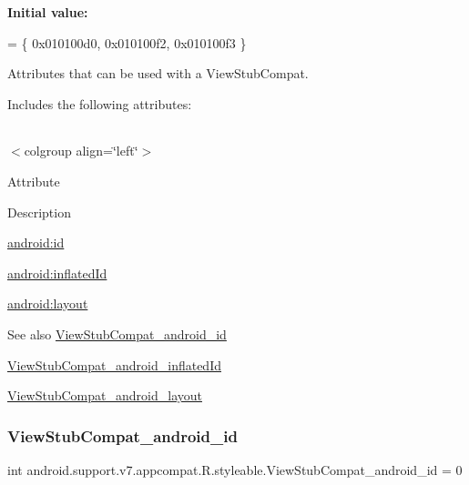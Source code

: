 {\bfseries Initial value\+:}
\begin{DoxyCode}
= \{
            0x010100d0, 0x010100f2, 0x010100f3
        \}
\end{DoxyCode}
Attributes that can be used with a View\+Stub\+Compat. 

Includes the following attributes\+:

\tabulinesep=1mm
\begin{longtabu} spread 0pt [c]{*{0}{|X[-1]}|}
\hline
\end{longtabu}
$<$colgroup align=\char`\"{}left\char`\"{}$>$ 

Attribute

Description 

{\ttfamily \hyperlink{classandroid_1_1support_1_1v7_1_1appcompat_1_1R_1_1styleable_ac15497ac2475a86ed2df12603e6c04a9}{android\+:id}}

{\ttfamily \hyperlink{classandroid_1_1support_1_1v7_1_1appcompat_1_1R_1_1styleable_a5bf098f703699e17e91981a226ad0c4b}{android\+:inflated\+Id}}

{\ttfamily \hyperlink{classandroid_1_1support_1_1v7_1_1appcompat_1_1R_1_1styleable_a6288011ef24789ef843fe6b8823fef96}{android\+:layout}}

\begin{DoxySeeAlso}{See also}
\hyperlink{classandroid_1_1support_1_1v7_1_1appcompat_1_1R_1_1styleable_ac15497ac2475a86ed2df12603e6c04a9}{View\+Stub\+Compat\+\_\+android\+\_\+id} 

\hyperlink{classandroid_1_1support_1_1v7_1_1appcompat_1_1R_1_1styleable_a5bf098f703699e17e91981a226ad0c4b}{View\+Stub\+Compat\+\_\+android\+\_\+inflated\+Id} 

\hyperlink{classandroid_1_1support_1_1v7_1_1appcompat_1_1R_1_1styleable_a6288011ef24789ef843fe6b8823fef96}{View\+Stub\+Compat\+\_\+android\+\_\+layout} 
\end{DoxySeeAlso}
\mbox{\label{classandroid_1_1support_1_1v7_1_1appcompat_1_1R_1_1styleable_ac15497ac2475a86ed2df12603e6c04a9}} 
\subsubsection{\texorpdfstring{View\+Stub\+Compat\+\_\+android\+\_\+id}{ViewStubCompat\_android\_id}}
{\footnotesize\ttfamily int android.\+support.\+v7.\+appcompat.\+R.\+styleable.\+View\+Stub\+Compat\+\_\+android\+\_\+id = 0\hspace{0.3cm}{\ttfamily [static]}}

